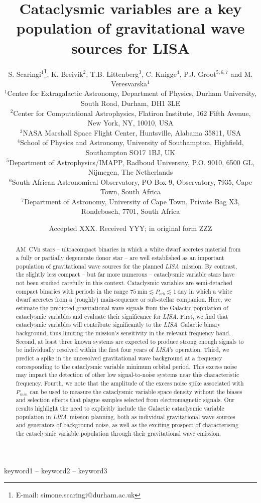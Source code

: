 \documentclass[fleqn,usenatbib]{mnras}
\title[LISA CVs]{Cataclysmic variables are a key population of gravitational wave sources for LISA}
\author[S. Scaringi et al.]{
S. Scaringi$^{1}$\thanks{E-mail: simone.scaringi@durham.ac.uk},
K. Breivik$^{2}$,
T.B. Littenberg$^{3}$,
C. Knigge$^{4}$,
P.J. Groot$^{5,6,7}$ and
M. Veresvarska$^{1}$
\\
$^{1}$Centre for Extragalactic Astronomy, Department of Physics, Durham University, South Road, Durham, DH1 3LE\\
$^{2}$Center for Computational Astrophysics, Flatiron Institute, 162 Fifth Avenue, New York, NY, 10010, USA\\
$^{3}$NASA Marshall Space Flight Center, Huntsville, Alabama 35811, USA\\
$^{4}$School of Physics and Astronomy, University of Southampton, Highfield, Southampton SO17 1BJ, UK\\
$^{5}$Department of Astrophysics/IMAPP, Radboud University, P.O. 9010, 6500 GL, Nijmegen, The Netherlands\\
$^{6}$South African Astronomical Observatory, PO Box 9, Observatory, 7935, Cape Town, South Africa\\
$^{7}$Department of Astronomy, University of Cape Town, Private Bag X3, Rondebosch, 7701, South Africa\\
}
\date{Accepted XXX. Received YYY; in original form ZZZ}
\newcommand{\lisa}{{\it LISA}}
\begin{document}
\label{firstpage}
\pagerange{\pageref{firstpage}--\pageref{lastpage}}
\maketitle

\begin{abstract}
AM~CVn stars -- ultracompact binaries in which a white dwarf accretes material from a fully or partially degenerate donor star -- are well established as an important population of gravitational wave sources for the planned \lisa\ mission. By contrast, the slightly less compact -- but far more numerous -- cataclysmic variable stars have not been studied carefully in this context. Cataclysmic variables are semi-detached compact binaries with periods in the range $75~\mathrm{min} \lesssim P_{orb} \lesssim 1~\mathrm{day}$ in which a white dwarf accretes from a (roughly) main-sequence or sub-stellar companion. Here, we estimate the predicted gravitational wave signals from the Galactic population of cataclysmic variables and evaluate their significance for \lisa. First, we find that cataclysmic variables will contribute significantly to the \lisa\ Galactic binary background, thus limiting the mission's sensitivity in the relevant frequency band. Second, at least three known systems are expected to produce strong enough signals to be individually resolved within the first four years of \lisa's operation. Third, we predict a spike in the unresolved gravitational wave background at a frequency corresponding to the cataclysmic variable minimum orbital period. This excess noise may impact the detection of other low signal-to-noise systems near this characteristic frequency. Fourth, we note that the amplitude of the excess noise spike associated with $P_{min}$ can be used to measure the cataclysmic variable space density without the biases and selection effects that plague samples selected from  electromagnetic signals. Our results highlight the need to explicitly include the Galactic cataclysmic variable population in \lisa\ mission planning, both as individual gravitational wave sources and generators of background noise, as well as the exciting prospect of characterising the cataclysmic variable population through their gravitational wave emission.
\end{abstract}


\begin{keywords}
keyword1 -- keyword2 -- keyword3
\end{keywords}
\end{document}
